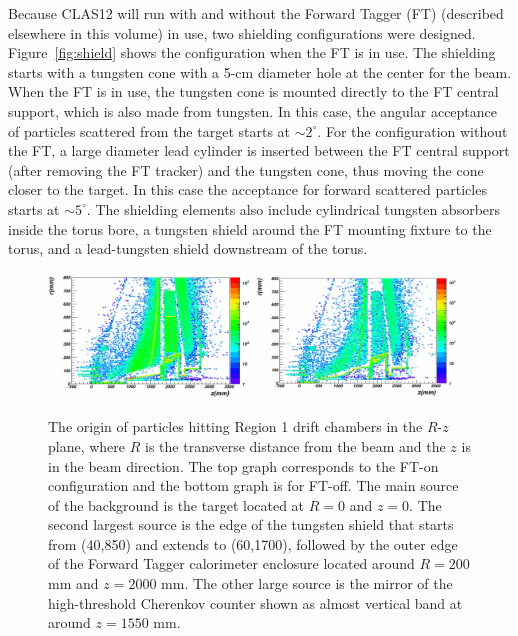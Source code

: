 Because CLAS12 will run with and without the Forward Tagger (FT) (described elsewhere in this volume) in use, two shielding 
configurations were designed. Figure~\ref{fig:shield} shows the configuration when the FT is in use. The shielding starts with a 
tungsten cone with a 5-cm diameter hole at the center for the beam. When the FT is in use, the tungsten cone is mounted directly 
to the FT central support, which is also made from tungsten. In this case, the angular acceptance of particles scattered from the target 
starts at $\sim 2^\circ$. For the configuration without the FT, a large diameter lead cylinder is inserted between the FT central support 
(after removing the FT tracker) and the tungsten cone, thus moving the cone closer to the target. In this case the acceptance for forward 
scattered particles starts at $\sim 5^\circ$. The shielding elements also include cylindrical tungsten absorbers inside the torus bore, a 
tungsten shield around the FT mounting fixture to the torus, and a lead-tungsten shield downstream of the torus.  

\begin{figure}[t]
\begin{center}
\includegraphics[width=0.48\textwidth]{fton_final_origin.pdf}
\includegraphics[width=0.48\textwidth]{ftoff_final_origin.pdf}
	\caption{The origin of particles hitting Region 1 drift chambers in the $R$-$z$ plane, where $R$ is the transverse distance from 
	the beam and the $z$ is in the beam direction. The top graph corresponds to the FT-on configuration and the bottom graph is for 
	FT-off. The main source of the background is the target located at $R=0$ and $z=0$. The second largest source is the edge of 
	the tungsten shield that starts from (40,850) and extends to (60,1700), followed by the outer edge of the Forward Tagger calorimeter 
	enclosure located around $R=200$ mm and $z=2000$ mm. The other large source is the mirror of the high-threshold Cherenkov 
	counter shown as almost vertical band at around $z=1550$ mm.}
\label{fig:origin}
\end{center}
\end{figure}


